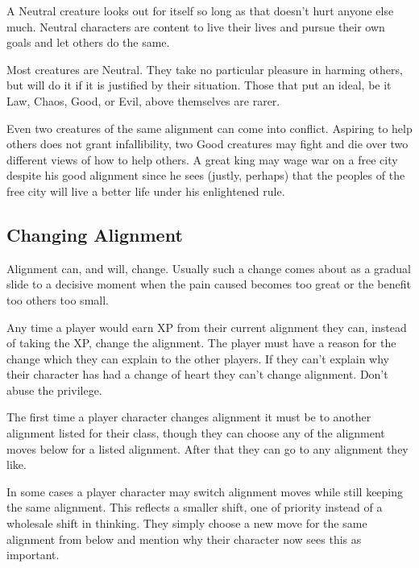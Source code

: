  

A Neutral creature looks out for itself so long as that doesn't hurt anyone else much. Neutral characters are content to live their lives and pursue their own goals and let others do the same.

 

Most creatures are Neutral. They take no particular pleasure in harming others, but will do it if it is justified by their situation. Those that put an ideal, be it Law, Chaos, Good, or Evil, above themselves are rarer.

 

Even two creatures of the same alignment can come into conflict. Aspiring to help others does not grant infallibility, two Good creatures may fight and die over two different views of how to help others. A great king may wage war on a free city despite his good alignment since he sees (justly, perhaps) that the peoples of the free city will live a better life under his enlightened rule.

 
\subsection{Changing Alignment}   
 

Alignment can, and will, change. Usually such a change comes about as a gradual slide to a decisive moment when the pain caused becomes too great or the benefit too others too small.

 

Any time a player would earn XP from their current alignment they can, instead of taking the XP, change the alignment. The player must have a reason for the change which they can explain to the other players. If they can't explain why their character has had a change of heart they can't change alignment. Don't abuse the privilege.

 

The first time a player character changes alignment it must be to another alignment listed for their class, though they can choose any of the alignment moves below for a listed alignment. After that they can go to any alignment they like.

 

In some cases a player character may switch alignment moves while still keeping the same alignment. This reflects a smaller shift, one of priority instead of a wholesale shift in thinking. They simply choose a new move for the same alignment from below and mention why their character now sees this as important.


